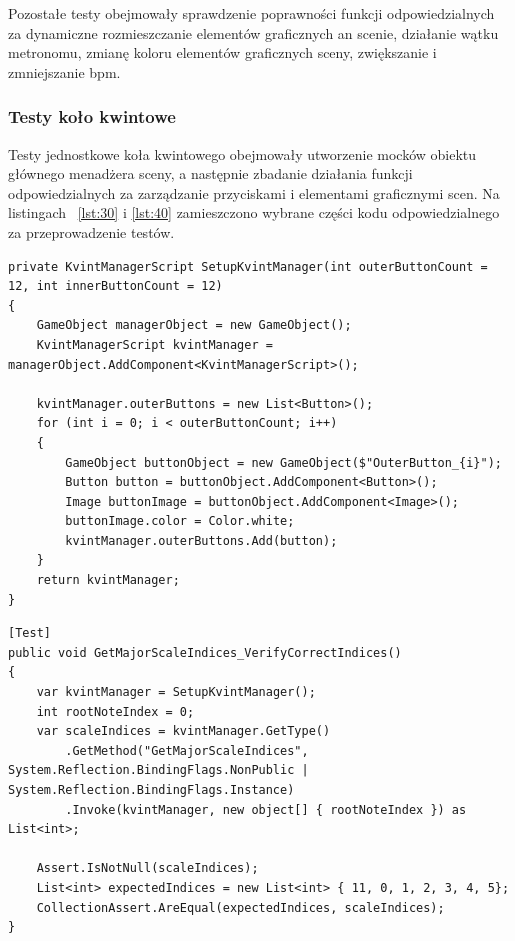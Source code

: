 Pozostałe testy obejmowały sprawdzenie poprawności funkcji odpowiedzialnych za dynamiczne rozmieszczanie elementów graficznych an scenie, działanie wątku metronomu, zmianę koloru elementów graficznych sceny, zwiększanie i zmniejszanie bpm.

\subsubsection{Testy koło kwintowe}

Testy jednostkowe koła kwintowego obejmowały utworzenie mocków obiektu głównego menadżera sceny, a następnie zbadanie działania funkcji odpowiedzialnych za zarządzanie przyciskami i elementami graficznymi scen. Na listingach ~\ref{lst:30} i \ref{lst:40} zamieszczono wybrane części kodu odpowiedzialnego za przeprowadzenie testów.

\begin{lstlisting}[style=sharpcstyle,caption=Funkcja \texttt{SetupKvintManager}, label=lst:30]
private KvintManagerScript SetupKvintManager(int outerButtonCount = 12, int innerButtonCount = 12)
{
    GameObject managerObject = new GameObject();
    KvintManagerScript kvintManager = managerObject.AddComponent<KvintManagerScript>();
    
    kvintManager.outerButtons = new List<Button>();
    for (int i = 0; i < outerButtonCount; i++)
    {
        GameObject buttonObject = new GameObject($"OuterButton_{i}");
        Button button = buttonObject.AddComponent<Button>();
        Image buttonImage = buttonObject.AddComponent<Image>();
        buttonImage.color = Color.white;
        kvintManager.outerButtons.Add(button);
    }
    return kvintManager;
}  
\end{lstlisting}

\begin{lstlisting}[style=sharpcstyle,caption=Funkcja \texttt{GetMajorScaleIndices\_VerifyCorrectIndices}, label=lst:40]
[Test]
public void GetMajorScaleIndices_VerifyCorrectIndices()
{
    var kvintManager = SetupKvintManager();
    int rootNoteIndex = 0;
    var scaleIndices = kvintManager.GetType()
        .GetMethod("GetMajorScaleIndices", System.Reflection.BindingFlags.NonPublic | System.Reflection.BindingFlags.Instance)
        .Invoke(kvintManager, new object[] { rootNoteIndex }) as List<int>;

    Assert.IsNotNull(scaleIndices);    
    List<int> expectedIndices = new List<int> { 11, 0, 1, 2, 3, 4, 5};
    CollectionAssert.AreEqual(expectedIndices, scaleIndices);
}
\end{lstlisting}

